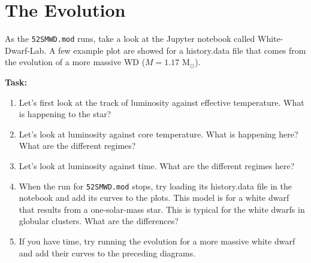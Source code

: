 \documentclass{article}
\begin{document}

\section{The Evolution}

As the \texttt{52SMWD.mod} runs, take a look at the Jupyter notebook called White-Dwarf-Lab. A few example plot are showed for a history.data file that comes from the evolution of a more massive WD ($M=1.17$ M$_\odot$).

\textbf{Task:}\vspace{-1em}
\begin{enumerate}
 \setlength\itemsep{0em}
\item Let's first look at the track of luminosity against effective temperature.  What is happening to the star?
\item Let's look at luminosity against core temperature.  What is happening here?  What are the different regimes?
\item Let's look at luminosity against time.  What are the different regimes here?
\item When the run for \texttt{52SMWD.mod} stops, try loading its history.data file in the notebook and add its curves to the plots. This model is for a white dwarf that results from a one-solar-mass star.  This is typical for the white dwarfs in globular clusters. What are the differences?
\item If you have time, try running the evolution for a more massive white dwarf and add their curves to the preceding diagrams.
\end{enumerate}
\end{document}
